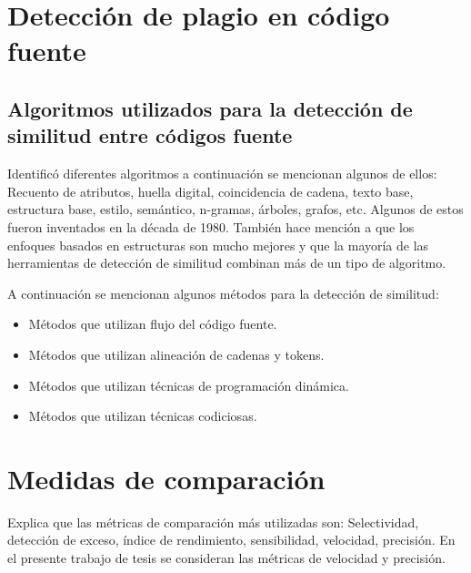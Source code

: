 \section{Detección de plagio en código fuente}
\subsection{Algoritmos utilizados para la detección de similitud entre códigos fuente}
\cite{10.1145/3313290} Identificó diferentes algoritmos a continuación se mencionan algunos de ellos: Recuento de atributos, huella digital, coincidencia de cadena, texto base, estructura base, estilo, semántico, n-gramas, árboles, grafos, etc. Algunos de estos fueron inventados en la década de 1980. También hace mención a que los enfoques basados en estructuras son mucho mejores y que la mayoría de las herramientas de detección de similitud combinan más de un tipo de algoritmo.

A continuación se mencionan algunos métodos para la detección de similitud:
\begin{itemize}
    \item Métodos que utilizan flujo del código fuente.
    \item Métodos que utilizan alineación de cadenas y tokens.
    \item Métodos que utilizan técnicas de programación dinámica.
    \item Métodos que utilizan técnicas codiciosas.
\end{itemize}

\section{Medidas de comparación}
\cite{10.1145/3313290} Explica que las métricas de comparación más utilizadas son: Selectividad, detección de exceso, índice de rendimiento, sensibilidad, velocidad, precisión. En el presente trabajo de tesis se consideran las métricas de velocidad y precisión.


